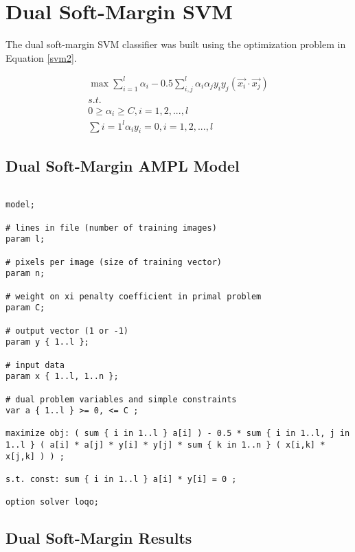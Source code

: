 \documentclass{article}
\begin{document}
\section{Dual Soft-Margin SVM}\label{model2}

The dual soft-margin SVM classifier was built using the optimization problem in Equation \ref{svm2}.

\begin{equation}\label{svm2}
\begin{split}
\max \sum_{i=1}^l \alpha_i - 0.5 \sum_{i,j}^l \alpha_i \alpha_j y_i y_j \left( \vec{x_i} \cdot \vec{x_j} \right) \\
s.t. \\
0 \ge \alpha_i \ge C , i = 1,2,...,l \\
\sum{i=1}^l \alpha_i y_i = 0 , i = 1,2,...,l
\end{split}
\end{equation}

\subsection{Dual Soft-Margin AMPL Model}

\begin{verbatim}

model;

# lines in file (number of training images)
param l;

# pixels per image (size of training vector)
param n;

# weight on xi penalty coefficient in primal problem
param C;

# output vector (1 or -1)
param y { 1..l };

# input data
param x { 1..l, 1..n };

# dual problem variables and simple constraints
var a { 1..l } >= 0, <= C ;

maximize obj: ( sum { i in 1..l } a[i] ) - 0.5 * sum { i in 1..l, j in 1..l } ( a[i] * a[j] * y[i] * y[j] * sum { k in 1..n } ( x[i,k] * x[j,k] ) ) ;

s.t. const: sum { i in 1..l } a[i] * y[i] = 0 ;

option solver loqo;

\end{verbatim}

\subsection{Dual Soft-Margin Results}
\end{document}
